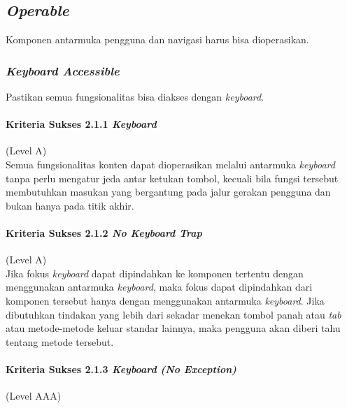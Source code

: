 \documentclass[a4paper,twoside]{article}
\begin{document}
\begin{enumerate}


		\subsection*{\textit{Operable}}
		\label{sec:operable}
		Komponen antarmuka pengguna dan navigasi harus bisa dioperasikan.

		\subsubsection*{\textit{Keyboard Accessible}}
		\label{sec:keyboard_accessible}
		Pastikan semua fungsionalitas bisa diakses dengan \textit{keyboard}.

		\paragraph{Kriteria Sukses 2.1.1 \textit{Keyboard}}
		\label{sec:kriteria_sukses_2.1.1}
		(Level A)\\

		Semua fungsionalitas konten dapat dioperasikan melalui antarmuka \textit{keyboard} tanpa perlu mengatur jeda antar ketukan tombol, kecuali bila fungsi tersebut membutuhkan masukan yang bergantung pada jalur gerakan pengguna dan bukan hanya pada titik akhir.

		\paragraph{Kriteria Sukses 2.1.2 \textit{No Keyboard Trap}}
		\label{sec:kriteria_sukses_2.1.2}
		(Level A)\\

		Jika fokus \textit{keyboard} dapat dipindahkan ke komponen tertentu dengan menggunakan antarmuka \textit{keyboard}, maka fokus dapat dipindahkan dari komponen tersebut hanya dengan menggunakan antarmuka \textit{keyboard}. Jika dibutuhkan tindakan yang lebih dari sekadar menekan tombol panah atau \textit{tab} atau metode-metode keluar standar lainnya, maka pengguna akan diberi tahu tentang metode tersebut.

		\paragraph{Kriteria Sukses 2.1.3 \textit{Keyboard (No Exception)}}
		\label{sec:kriteria_sukses_2.1.3}
		(Level AAA)\\


\end{enumerate}
\end{document}
